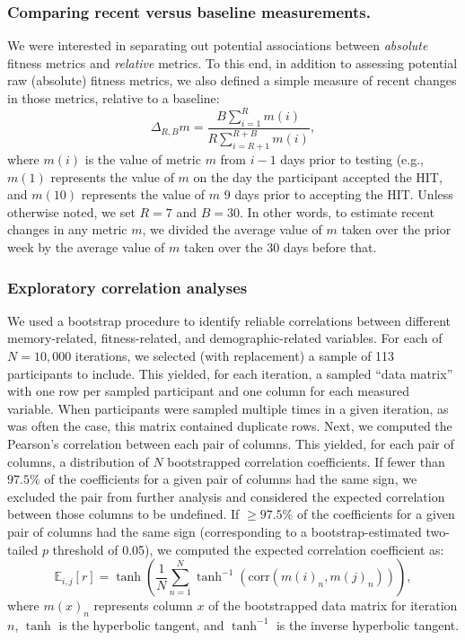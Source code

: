 \documentclass[10pt]{article}
\begin{document}
\subsubsection*{Comparing recent versus baseline measurements.}
We were interested in separating out potential associations between
\textit{absolute} fitness metrics and \textit{relative} metrics.  To
this end, in addition to assessing potential raw (absolute) fitness
metrics, we also defined a simple measure of recent changes in those
metrics, relative to a baseline:
\[
  \Delta_{R, B} m = \frac{B \sum_{i = 1}^R
  m(i)}{R \sum_{i=R + 1}^{R+B}m(i)},
\]
where $m(i)$ is the value of metric $m$ from $i - 1$ days prior to
testing (e.g., $m(1)$ represents the value of $m$ on the day the
participant accepted the HIT, and $m(10)$ represents the value of $m$
9 days prior to accepting the HIT.  Unless otherwise noted, we set
$R = 7$ and $B = 30$.  In other words, to estimate recent changes in
any metric $m$, we divided the average value of $m$ taken over the
prior week by the average value of $m$ taken over the 30 days before
that.


\subsubsection*{Exploratory correlation analyses}
We used a bootstrap procedure to identify reliable correlations
between different memory-related, fitness-related, and
demographic-related variables.  For each of $N = 10,000$ iterations, we
selected (with replacement) a sample of 113 participants to include.
This yielded, for each iteration, a sampled ``data matrix'' with one
row per sampled participant and one column for each measured variable.
When participants were sampled multiple times in a given iteration, as
was often the case, this matrix contained duplicate rows.  Next, we computed the Pearson's correlation
between each pair of columns.  This yielded, for each pair of columns,
a distribution of $N$ bootstrapped correlation coefficients.  If fewer
than $97.5\%$ of the coefficients for a given pair of columns had the
same sign, we excluded the pair from further analysis and considered
the expected correlation between those columns to be undefined.  If
$\geq 97.5\%$ of the coefficients for a given pair of columns had the
same sign (corresponding to a bootstrap-estimated two-tailed $p$
threshold of 0.05), we computed the expected correlation coefficient as:
\[
  \mathbb{E}_{i, j}\left[ r\right] = \tanh\left(\frac{1}{N} \sum_{n=1}^N
  \tanh^{-1}(\mathrm{corr}\left(m(i)_n, m(j)_n\right))\right),
\]
where $m(x)_n$ represents column $x$ of the bootstrapped data matrix
for iteration $n$, $\tanh$ is the hyperbolic tangent, and $\tanh^{-1}$
is the inverse hyperbolic tangent.
\end{document}
